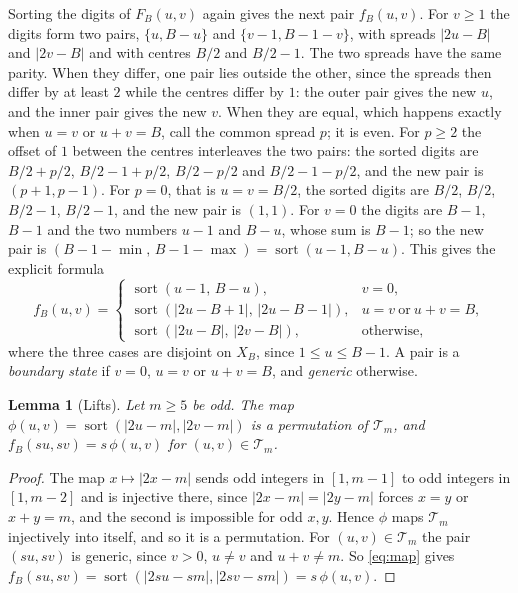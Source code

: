 \documentclass[11pt]{amsart}
\newtheorem{lemma}[theorem]{Lemma}
\theoremstyle{definition}
\theoremstyle{remark}
\DeclareMathOperator{\sort}{sort}
\newcommand{\T}{\mathcal{T}}
\begin{document}
Sorting the digits of $F_B(u,v)$ again gives the next pair $f_B(u,v)$. For $v\ge1$ the digits form two pairs, $\{u,B-u\}$ and $\{v-1,B-1-v\}$, with spreads $|2u-B|$ and $|2v-B|$ and with centres $B/2$ and $B/2-1$. The two spreads have the same parity. When they differ, one pair lies outside the other, since the spreads then differ by at least $2$ while the centres differ by $1$: the outer pair gives the new $u$, and the inner pair gives the new $v$. When they are equal, which happens exactly when $u=v$ or $u+v=B$, call the common spread $p$; it is even. For $p\ge2$ the offset of $1$ between the centres interleaves the two pairs: the sorted digits are $B/2+p/2$, $B/2-1+p/2$, $B/2-p/2$ and $B/2-1-p/2$, and the new pair is $(p+1,p-1)$. For $p=0$, that is $u=v=B/2$, the sorted digits are $B/2$, $B/2$, $B/2-1$, $B/2-1$, and the new pair is $(1,1)$. For $v=0$ the digits are $B-1$, $B-1$ and the two numbers $u-1$ and $B-u$, whose sum is $B-1$; so the new pair is $(B-1-\min,\,B-1-\max)=\sort(u-1,B-u)$. This gives the explicit formula \cite[Section~2]{DZ}
\begin{equation}\label{eq:map}
f_B(u,v)=
\begin{cases}
\sort(u-1,\,B-u), & v=0,\\
\sort(|2u-B+1|,\,|2u-B-1|), & u=v\ \text{or}\ u+v=B,\\
\sort(|2u-B|,\,|2v-B|), & \text{otherwise},
\end{cases}
\end{equation}
where the three cases are disjoint on $X_B$, since $1\le u\le B-1$. A pair is a \emph{boundary state} if $v=0$, $u=v$ or $u+v=B$, and \emph{generic} otherwise.

\begin{lemma}[Lifts]\label{lem:lift}
Let $m\ge5$ be odd. The map $\phi(u,v)=\sort(|2u-m|,|2v-m|)$ is a permutation of $\T_m$, and $f_B(su,sv)=s\,\phi(u,v)$ for $(u,v)\in\T_m$.
\end{lemma}

\begin{proof}
The map $x\mapsto|2x-m|$ sends odd integers in $[1,m-1]$ to odd integers in $[1,m-2]$ and is injective there, since $|2x-m|=|2y-m|$ forces $x=y$ or $x+y=m$, and the second is impossible for odd $x,y$. Hence $\phi$ maps $\T_m$ injectively into itself, and so it is a permutation. For $(u,v)\in\T_m$ the pair $(su,sv)$ is generic, since $v>0$, $u\ne v$ and $u+v\ne m$. So \eqref{eq:map} gives $f_B(su,sv)=\sort(|2su-sm|,|2sv-sm|)=s\,\phi(u,v)$.
\end{proof}
\end{document}
